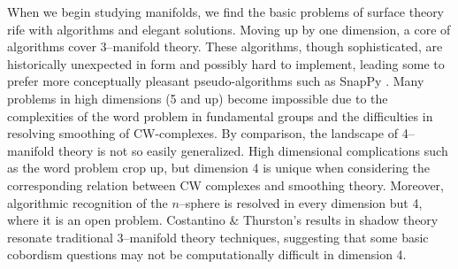 \label{chapter:introduction}

When we begin studying manifolds, we find the basic problems of surface theory rife with algorithms and elegant solutions.
Moving up by one dimension, a core of algorithms cover 3--manifold theory.
These algorithms, though sophisticated, are historically unexpected in form and possibly hard to implement, leading some to prefer more conceptually pleasant pseudo-algorithms such as SnapPy \cite{culler2017snappy}.
Many problems in high dimensions (5 and up) become impossible due to the complexities of the word problem in fundamental groups and the difficulties in resolving smoothing of CW-complexes.
By comparison, the landscape of 4--manifold theory is not so easily generalized.
High dimensional complications such as the word problem crop up, but dimension 4 is unique when considering the corresponding relation between CW complexes and smoothing theory.
Moreover, algorithmic recognition of the $n$--sphere is resolved in every dimension but 4, where it is an open problem.
Costantino \& Thurston's results in shadow theory resonate traditional 3--manifold theory techniques, suggesting that some basic cobordism questions may not be computationally difficult in dimension 4.



